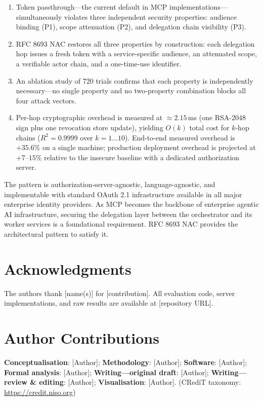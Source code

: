 \documentclass[journal]{IEEEtran}
\begin{document}
\begin{enumerate}
  \item Token passthrough---the current default in MCP implementations---
        simultaneously violates three independent security properties: audience
        binding (P1), scope attenuation (P2), and delegation chain visibility
        (P3).
  \item RFC 8693 NAC restores all three properties by construction: each
        delegation hop issues a fresh token with a service-specific audience,
        an attenuated scope, a verifiable actor chain, and a one-time-use
        identifier.
  \item An ablation study of 720 trials confirms that each property is
        independently necessary---no single property and no two-property
        combination blocks all four attack vectors.
  \item Per-hop cryptographic overhead is measured at $\approx 2.15$\,ms
        (one RSA-2048 sign plus one revocation store update), yielding $O(k)$
        total cost for $k$-hop chains ($R^2 = 0.9999$ over $k=1\ldots10$).
        End-to-end measured overhead is $+35.6\%$ on a single machine;
        production deployment overhead is projected at $+7$--$15\%$ relative
        to the insecure baseline with a dedicated authorization server.
\end{enumerate}

The pattern is authorization-server-agnostic, language-agnostic, and
implementable with standard OAuth 2.1 infrastructure available in all major
enterprise identity providers. As MCP becomes the backbone of enterprise agentic
AI infrastructure, securing the delegation layer between the orchestrator and its
worker services is a foundational requirement. RFC 8693 NAC provides the
architectural pattern to satisfy it.

\FloatBarrier  %

\section*{Acknowledgments}
The authors thank [name(s)] for [contribution]. All evaluation code, server
implementations, and raw results are available at [repository URL].

\section*{Author Contributions}
\textbf{Conceptualisation}: [Author]; \textbf{Methodology}: [Author];
\textbf{Software}: [Author]; \textbf{Formal analysis}: [Author];
\textbf{Writing---original draft}: [Author];
\textbf{Writing---review \& editing}: [Author];
\textbf{Visualisation}: [Author].
(CRediT taxonomy: \url{https://credit.niso.org})
\end{document}
